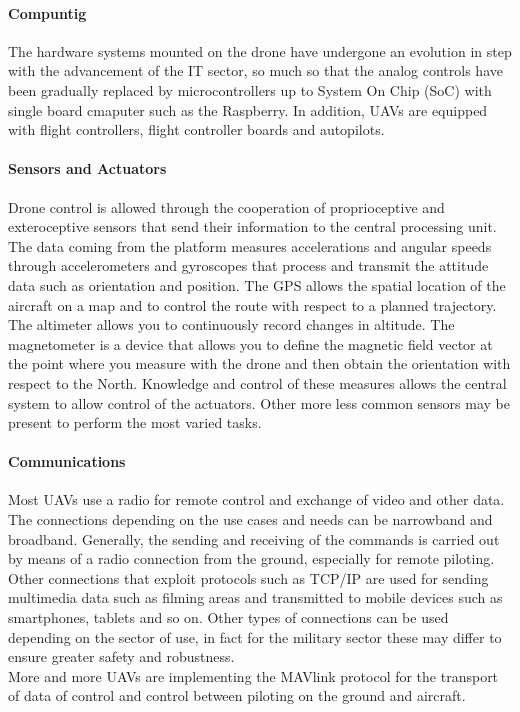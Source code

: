 \paragraph{Compuntig}
The hardware systems mounted on the drone have undergone an evolution in step
with the advancement of the IT sector, so much so that the analog controls have
been gradually replaced by microcontrollers up to System On Chip (SoC) with
single board cmaputer such as the Raspberry. In addition, UAVs are equipped with
flight controllers, flight controller boards and autopilots.
%
\paragraph{Sensors and Actuators}
Drone control is allowed through the cooperation of proprioceptive and
exteroceptive sensors that send their information to the central processing
unit.
The data coming from the platform measures accelerations and angular speeds
through accelerometers and gyroscopes that process and transmit the attitude
data such as orientation and position.
The GPS allows the spatial location of the aircraft on a map and to control the
route with respect to a planned trajectory. The altimeter allows you to
continuously record changes in altitude. The magnetometer is a device that
allows you to define the magnetic field vector at the point where you measure
with the drone and then obtain the orientation with respect to the North.
Knowledge and control of these measures allows the central system to allow
control of the actuators. Other more less common sensors may be present to
perform the most varied tasks.
%
\paragraph{Communications}
Most UAVs use a radio for remote control and exchange of video and other data.
The connections depending on the use cases and needs can be narrowband and
broadband. Generally, the sending and receiving of the commands is carried out
by means of a radio connection from the ground, especially for remote piloting.\\
Other connections that exploit protocols such as TCP/IP are used for sending
multimedia data such as filming areas and transmitted to mobile devices such as
smartphones, tablets and so on.
Other types of connections can be used depending on the sector of use, in fact
for the military sector these may differ to ensure greater safety and
robustness.\\ 
More and more UAVs are implementing the MAVlink protocol for the
transport of data of control and control between piloting on the ground and
aircraft.
%
%
